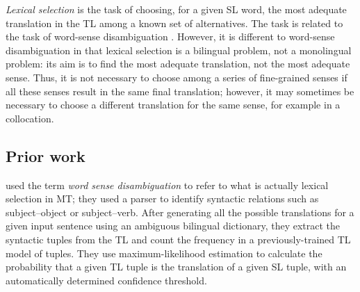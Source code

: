 \documentclass[11pt]{article}
\newcommand{\comment}[1]{\todo{#1}}
\begin{document}
\emph{Lexical selection} is the task of choosing, for a given SL word,
the most adequate translation in the TL among a known set of
alternatives.  The task is related to the task of word-sense
disambiguation \citep{ide98a}. However, it is different to word-sense
disambiguation in that lexical selection is a bilingual problem, not a
monolingual problem: its aim is to find the most adequate translation,
not the most adequate sense. Thus, it is not necessary to choose
among a series of fine-grained senses if all these senses result in
the same final translation; however, it may sometimes be necessary to
choose a different translation for the same sense, for example in a
collocation.


\subsection{Prior work}
\cite{dagan1994word} used the term \emph{word sense disambiguation} to
refer to what is actually lexical selection in MT; they
used a parser to identify syntactic relations such as subject--object
or subject--verb.  After generating all the possible translations for
a given input sentence using an ambiguous bilingual dictionary, they
extract the syntactic tuples from the TL and count the frequency in a
previously-trained TL model of tuples.  They use maximum-likelihood
estimation to calculate the probability that a given TL tuple is the
translation of a given SL tuple, with an automatically determined
confidence threshold.
\end{document}
